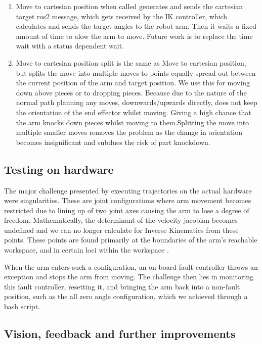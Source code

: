 \documentclass{article}
\begin{document}
\begin{enumerate}
\begin{enumerate}
            \item Move to cartesian position when called generates and sends the cartesian target ros2 message, which gets received by the IK controller, which calculates and sends the target angles to the robot arm. Then it waits a fixed amount of time to alow the arm to move. Future work is to replace the time wait with a status dependent  wait. 
            \item Move to cartesian position split is the same as Move to cartesian position, but splits the move into multiple moves to points equally spread out between the current position of the arm and target position. We use this for moving down above pieces or to dropping pieces. Because due to the nature of the normal path planning any moves, downwards/upwards directly, does not keep the orientation of the end effector whilst moving. Giving a high chance that the arm knocks down pieces whilst moving to them.Splitting the move into multiple smaller moves removes the problem as the change in orientation becomes insignificant and subdues the risk of part knockdown. 
        
        \end{enumerate}
\end{enumerate}

\subsection{Testing on hardware}

The major challenge presented by executing trajectories on the actual hardware were singularities. These are joint configurations where arm movement becomes restricted due to lining up of two joint axes causing the arm to lose a degree of freedom. Mathematically, the determinant of the velocity jacobian becomes undefined and we can no longer calculate for Inverse Kinematics from these points. These points are found primarily at the boundaries of the arm’s reachable workspace, and in certain loci within the workspace \cite{craigIntroductionRoboticsMechanics2014}. 

When the arm enters such a configuration, an on-board fault controller throws an exception and stops the arm from moving. The challenge then lies in monitoring this fault controller, resetting it, and bringing the arm back into a non-fault position, such as the all zero angle configuration, which we achieved through a bash script.

\subsection{Vision, feedback and further improvements}
\end{document}
